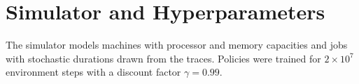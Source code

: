 \chapter{Simulator and Hyperparameters}
\label{app:a}

The simulator models machines with processor and memory capacities and jobs with stochastic
durations drawn from the traces. Policies were trained for $2 \times 10^7$ environment steps
with a discount factor $\gamma = 0.99$.
